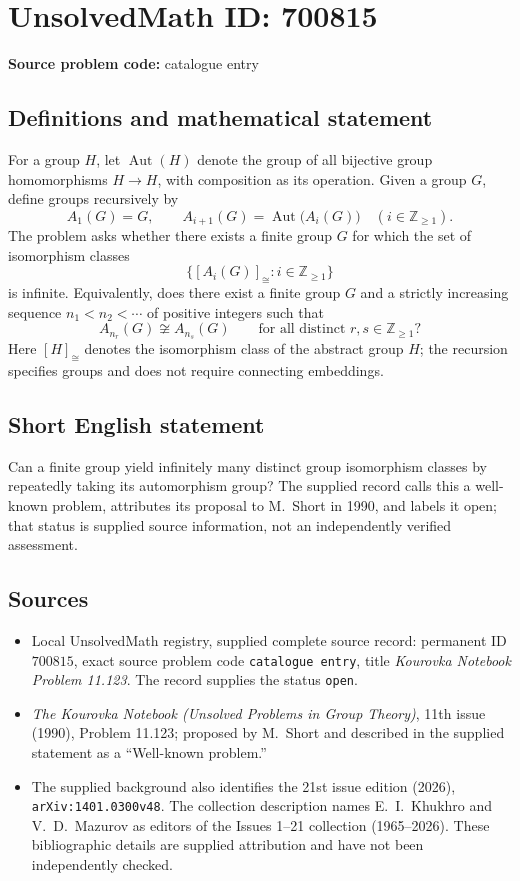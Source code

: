 \documentclass[11pt]{article}
\newcommand{\Z}{\mathbb{Z}}
\begin{document}
\section*{UnsolvedMath ID: 700815}
\textbf{Source problem code:} catalogue entry
\subsection{Definitions and mathematical statement}
For a group \(H\), let \(\operatorname{Aut}(H)\) denote the group of all bijective group homomorphisms \(H\to H\), with composition as its operation. Given a group \(G\), define groups recursively by
\[
A_1(G)=G,\qquad A_{i+1}(G)=\operatorname{Aut}\bigl(A_i(G)\bigr)\quad(i\in\Z_{\geq 1}).
\]
The problem asks whether there exists a finite group \(G\) for which the set of isomorphism classes
\[
\bigl\{[A_i(G)]_{\cong}:i\in\Z_{\geq 1}\bigr\}
\]
is infinite. Equivalently, does there exist a finite group \(G\) and a strictly increasing sequence \(n_1<n_2<\cdots\) of positive integers such that
\[
A_{n_r}(G)\not\cong A_{n_s}(G)\qquad\text{for all distinct }r,s\in\Z_{\geq 1}?
\]
Here \([H]_{\cong}\) denotes the isomorphism class of the abstract group \(H\); the recursion specifies groups and does not require connecting embeddings.
\subsection{Short English statement}
Can a finite group yield infinitely many distinct group isomorphism classes by repeatedly taking its automorphism group? The supplied record calls this a well-known problem, attributes its proposal to M.~Short in 1990, and labels it open; that status is supplied source information, not an independently verified assessment.
\subsection{Sources}
\begin{itemize}
\item Local UnsolvedMath registry, supplied complete source record: permanent ID \(700815\), exact source problem code \texttt{catalogue entry}, title \emph{Kourovka Notebook Problem 11.123}. The record supplies the status \texttt{open}.
\item \emph{The Kourovka Notebook (Unsolved Problems in Group Theory)}, 11th issue (1990), Problem 11.123; proposed by M.~Short and described in the supplied statement as a ``Well-known problem.''
\item The supplied background also identifies the 21st issue edition (2026), \texttt{arXiv:1401.0300v48}. The collection description names E.~I.~Khukhro and V.~D.~Mazurov as editors of the Issues 1--21 collection (1965--2026). These bibliographic details are supplied attribution and have not been independently checked.
\end{itemize}
\end{document}
